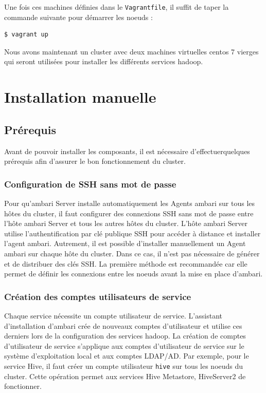 \documentclass[12pt, french]{report}
\begin{document}
Une fois ces machines définies dans le \texttt{Vagrantfile}, il suffit de taper la commande suivante pour démarrer les noeuds :

\begin{verbatim}
$ vagrant up
\end{verbatim}

Nous avons maintenant un cluster avec deux machines virtuelles \gls{centos} 7 vierges qui seront utilisées pour installer les différents services \gls{hadoop}.

\section{Installation manuelle}

\subsection{Prérequis}

Avant de pouvoir installer les composants, il est nécessaire d'effectuerquelques prérequis afin d'assurer le bon fonctionnement du cluster.

\subsubsection{Configuration de SSH sans mot de passe}

Pour qu'\gls{ambari} Server installe automatiquement les Agents \gls{ambari} sur tous les hôtes du cluster, il faut configurer des connexions SSH sans mot de passe entre l'hôte \gls{ambari} Server et tous les autres hôtes du cluster. L'hôte \gls{ambari} Server utilise l'authentification par clé publique SSH pour accéder à distance et installer l'agent \gls{ambari}. Autrement, il est possible d'installer manuellement un Agent \gls{ambari} sur chaque hôte du cluster. Dans ce cas, il n'est pas nécessaire de générer et de distribuer des clés SSH. La première méthode est recommandée car elle permet de définir les connexions entre les noeuds avant la mise en place d'\gls{ambari}.

\subsubsection{Création des comptes utilisateurs de service}

Chaque service nécessite un compte utilisateur de service. L'assistant d'installation d'\gls{ambari} crée de nouveaux comptes d'utilisateur et utilise ces derniers lors de la configuration des services \gls{hadoop}. La création de comptes d'utilisateur de service s'applique aux comptes d'utilisateur de service sur le système d'exploitation local et aux comptes LDAP/AD. Par exemple, pour le service Hive, il faut créer un compte utilisateur \texttt{hive} sur tous les noeuds du cluster. Cette opération permet aux services Hive Metastore, HiveServer2 de fonctionner.
\end{document}
